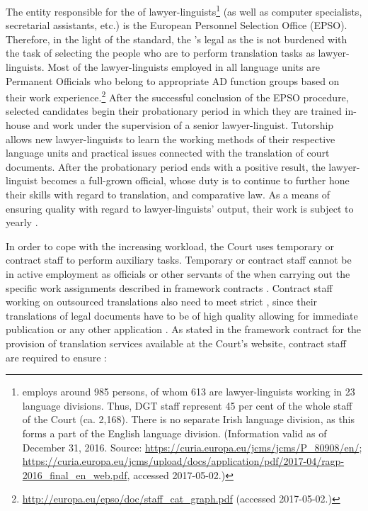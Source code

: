 \documentclass[output=paper]{langsci/langscibook}
\begin{document}
The entity responsible for the  of lawyer-linguists\footnote{ employs around 985 persons, of whom 613 are lawyer-linguists working in 23 language divisions. Thus, DGT staff represent 45 per cent of the whole staff of the Court (ca. 2,168). There is no separate Irish language division, as this forms a part of the English language division. (Information valid as of December 31, 2016. Source: \url{https://curia.europa.eu/jcms/jcms/P_80908/en/};
\url{https://curia.europa.eu/jcms/upload/docs/application/pdf/2017-04/ragp-2016_final_en_web.pdf},
accessed 2017-05-02.)} (as well as computer specialists, secretarial assistants, etc.) is the European Personnel Selection Office (EPSO). Therefore, in the light of the \citeauthor{ISO2015} standard, the ’s legal  as the  is not burdened with the task of selecting the people who are to perform translation tasks as lawyer-linguists. Most of the lawyer-linguists employed in all language units are Permanent Officials who belong to appropriate AD function groups based on their work experience.\footnote{\url{http://europa.eu/epso/doc/staff_cat_graph.pdf} (accessed 2017-05-02.)} After the successful conclusion of the EPSO procedure, selected candidates begin their probationary period in which they are trained in-house and work under the supervision of a senior lawyer-linguist. Tutorship allows new lawyer-linguists to learn the working methods of their respective language units and practical issues connected with the translation of court documents. After the probationary period ends with a positive result, the lawyer-linguist becomes a full-grown  official, whose duty is to continue to further hone their skills with regard to translation,  and comparative law. As a means of ensuring quality with regard to lawyer-linguists’ output, their work is subject to yearly .

In order to cope with the increasing workload, the Court uses temporary or contract staff to perform auxiliary tasks. Temporary or contract staff cannot be in active employment as officials or other servants of the  when carrying out the specific work assignments described in framework contracts \citep[16]{FCPTS2017}. Contract staff working on outsourced translations also need to meet strict , since their translations of legal documents have to be of high quality allowing for immediate publication or any other application \citep[16]{FCPTS2017}. As stated in the framework contract for the provision of translation services available at the Court’s website, contract staff are required to ensure \citep[11]{FCPTS2017}:
\end{document}
